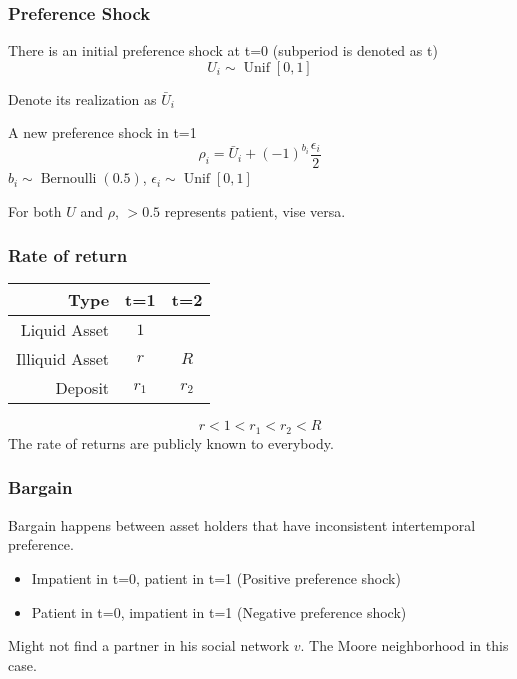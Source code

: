 \begin{frame}
    \frametitle{Preference Shock}
    There is an initial preference shock at t=0 (subperiod is denoted as t)
    \begin{equation*}
        U_i \sim \operatorname{Unif}[0,1]
    \end{equation*}

    Denote its realization as $\bar{U}_i$
    
    A new preference shock in t=1 
    \begin{equation*}
        \rho_{i} = \bar{U}_i + (-1)^{b_i}\frac{\epsilon_i}{2}
    \end{equation*}
    $b_i \sim \operatorname{Bernoulli}(0.5)$,  $\epsilon_i\sim \operatorname{Unif}[0,1]$

    For both $U$ and $\rho$, $>0.5$ represents patient, vise versa.
\end{frame}

\begin{frame}
    \frametitle{Rate of return}
    \begin{table}
        \centering

        \begin{tabular}[h]{r c c}
            Type & t=1 & t=2 \\
            \hline 
            Liquid Asset & $1$ & \\
            Illiquid Asset & $r$ & $R$ \\
            Deposit & $r_1$ & $r_2$ \\
            \hline            
        \end{tabular}
    \end{table}

    \begin{equation*}
        r<1<r_1<r_2<R
    \end{equation*}
    The rate of returns are publicly known to everybody.

\end{frame}

\begin{frame}
    \frametitle{Bargain}
    Bargain happens between asset holders that have inconsistent intertemporal preference. 
    \begin{itemize}
        \item Impatient in t=0, patient in t=1 (Positive preference shock)
        \item Patient in t=0, impatient in t=1 (Negative preference shock)
    \end{itemize}
    \vfill
    Might not find a partner in his social network $v$. The Moore neighborhood in this case.
\end{frame}

